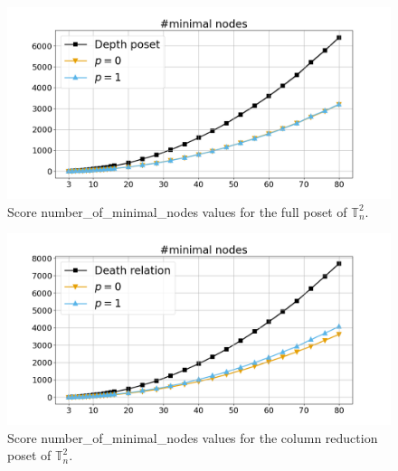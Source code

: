 \documentclass{article}
\begin{document}
    \begin{figure}[h!]
        \centering
        \hspace*{-0.24\textwidth}
        \includegraphics[width=1.4\textwidth]{pics/extended torus scores/score=number-of-minimal-nodes, dim=2, object=full.png}
        \caption{Score number\_of\_minimal\_nodes values for the full poset of $\mathbb{T}_n^{2}$.}
        \label{fig:numberofminimalnodes-full2}
    \end{figure}
    \begin{figure}[h!]
        \centering
        \hspace*{-0.24\textwidth}
        \includegraphics[width=1.4\textwidth]{pics/extended torus scores/score=number-of-minimal-nodes, dim=2, object=column reduction.png}
        \caption{Score number\_of\_minimal\_nodes values for the column reduction poset of $\mathbb{T}_n^{2}$.}
        \label{fig:numberofminimalnodes-columnreduction2}
    \end{figure}
\end{document}
